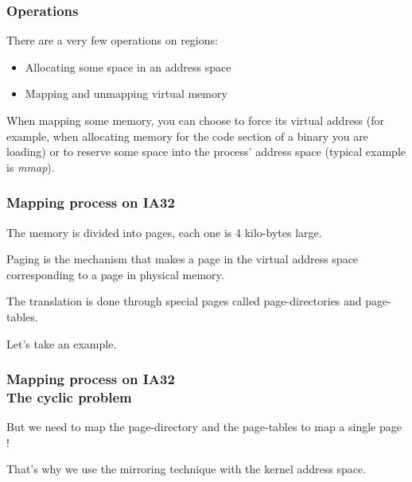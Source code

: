 
\begin{frame}
  \frametitle{Operations}

  There are a very few operations on regions:

  \begin{itemize}
  \item Allocating some space in an address space
  \item Mapping and unmapping virtual memory
  \end{itemize}

  \nl

  When  mapping some  memory,  you  can choose  to  force its  virtual
  address (for example, when allocating memory for the code section of
  a binary you are loading) or to reserve some space into the process'
  address space (typical example is \emph{mmap}).

\end{frame}


\begin{frame}
  \frametitle{Mapping process on IA32}

  The memory is divided into pages, each one is 4 kilo-bytes large.

  \nl

  Paging  is the mechanism  that makes  a page  in the  virtual address
  space corresponding to a page in physical memory.

  \nl

  The   translation    is   done   through    special   pages   called
  page-directories and page-tables.

  \nl

  Let's take an example.

\end{frame}


\begin{frame}
  \frametitle{Mapping process on IA32\\The cyclic problem}

  But we need  to map the page-directory and the  page-tables to map a
  single page !

  \nl

  That's why we use the mirroring technique with the kernel address space.

\end{frame}

%
%

